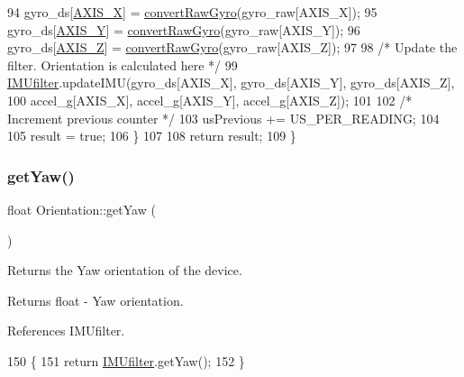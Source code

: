 \begin{DoxyCode}
94     gyro\_ds[\hyperlink{_orientation_8cpp_a753faa457a1c2937ea3fdcdb83c3ca5f}{AXIS\_X}] = \hyperlink{class_logging_device_1_1_orientation_a99bb5ed3c3226c5d636fa48f26f491dd}{convertRawGyro}(gyro\_raw[AXIS\_X]);
95     gyro\_ds[\hyperlink{_orientation_8cpp_a08f3e26d90cf66bf2840d476e5d4711f}{AXIS\_Y}] = \hyperlink{class_logging_device_1_1_orientation_a99bb5ed3c3226c5d636fa48f26f491dd}{convertRawGyro}(gyro\_raw[AXIS\_Y]);
96     gyro\_ds[\hyperlink{_orientation_8cpp_a220ebc22eb87c8989bfd63ae3cbbe2a8}{AXIS\_Z}] = \hyperlink{class_logging_device_1_1_orientation_a99bb5ed3c3226c5d636fa48f26f491dd}{convertRawGyro}(gyro\_raw[AXIS\_Z]);
97 
98     \textcolor{comment}{/* Update the filter. Orientation is calculated here */}
99     \hyperlink{class_logging_device_1_1_orientation_a517282a58a498881d97d57f4829a38d9}{IMUfilter}.updateIMU(gyro\_ds[AXIS\_X], gyro\_ds[AXIS\_Y], gyro\_ds[AXIS\_Z],
100                         accel\_g[AXIS\_X], accel\_g[AXIS\_Y], accel\_g[AXIS\_Z]);
101 
102     \textcolor{comment}{/* Increment previous counter */}
103     usPrevious += US\_PER\_READING;
104 
105     result = \textcolor{keyword}{true};
106   \}
107 
108   \textcolor{keywordflow}{return} result;
109 \}
\end{DoxyCode}
\mbox{\label{class_logging_device_1_1_orientation_a3dbaa1ee014811c40d5b9f39b544c19b}} 
\subsubsection{\texorpdfstring{get\+Yaw()}{getYaw()}}
{\footnotesize\ttfamily float Orientation\+::get\+Yaw (\begin{DoxyParamCaption}{ }\end{DoxyParamCaption})}



Returns the Yaw orientation of the device. 

\begin{DoxyReturn}{Returns}
float -\/ Yaw orientation. 
\end{DoxyReturn}


References I\+M\+Ufilter.


\begin{DoxyCode}
150 \{
151   \textcolor{keywordflow}{return} \hyperlink{class_logging_device_1_1_orientation_a517282a58a498881d97d57f4829a38d9}{IMUfilter}.getYaw();
152 \}
\end{DoxyCode}
\mbox{\label{class_logging_device_1_1_orientation_a7ec1a2964fc858bbd5da22a505b087c8}} 
